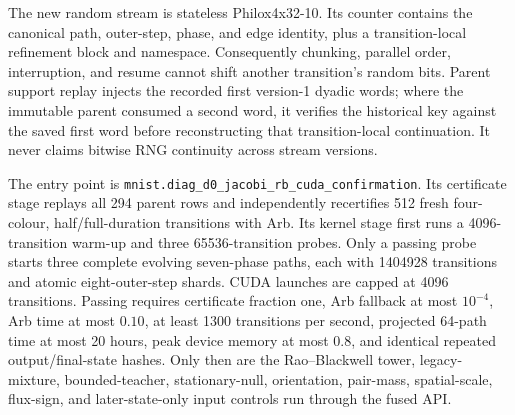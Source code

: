 \documentclass[11pt]{article}
\numberwithin{equation}{section}
\newcommand{\1}{\mathbf 1}
\begin{document}
The new random stream is stateless Philox4x32-10.  Its counter contains the
canonical path, outer-step, phase, and edge identity, plus a
transition-local refinement block and namespace.  Consequently chunking,
parallel order, interruption, and resume cannot shift another transition's
random bits.  Parent support replay injects the recorded first version-1
dyadic words; where the immutable parent consumed a second word, it verifies
the historical key against the saved first word before reconstructing that
transition-local continuation.  It never claims bitwise RNG continuity
across stream versions.

The entry point is
\nolinkurl{mnist.diag_d0_jacobi_rb_cuda_confirmation}.  Its certificate stage
replays all 294 parent rows and independently recertifies 512 fresh
four-colour, half/full-duration transitions with Arb.  Its kernel stage first
runs a 4096-transition warm-up and three 65536-transition probes.  Only a
passing probe starts three complete evolving seven-phase paths, each with
1404928 transitions and atomic eight-outer-step shards.  CUDA launches are
capped at 4096 transitions.  Passing requires certificate fraction one, Arb
fallback at most $10^{-4}$, Arb time at most $0.10$, at least 1300
transitions per second, projected 64-path time at most 20 hours, peak device
memory at most $0.8$, and identical repeated output/final-state hashes.
Only then are the Rao--Blackwell tower, legacy-mixture, bounded-teacher,
stationary-null, orientation, pair-mass, spatial-scale, flux-sign, and
later-state-only input controls run through the fused API.
\end{document}
